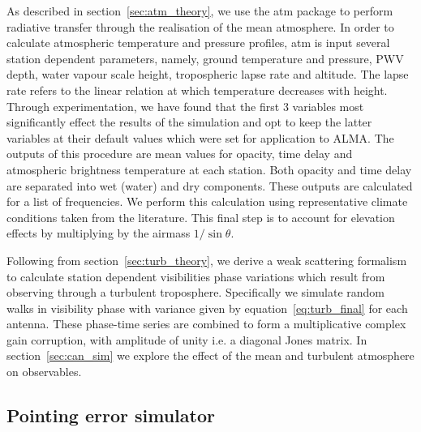 As described in section~\ref{sec:atm_theory}, we use the {\sc atm} package to perform radiative transfer through the realisation of the mean atmosphere. 
In order to calculate atmospheric temperature and pressure profiles, {\sc atm} is input several station dependent parameters, namely, ground temperature and pressure, PWV depth, water vapour scale height, tropospheric lapse rate  and altitude. The lapse rate refers to the linear relation at which temperature decreases with height. Through experimentation, we have found that the first 3 variables most significantly effect the results of the simulation and opt to keep the latter variables at their default values which were set for application to ALMA. 
The outputs of this procedure are mean values for opacity, time delay and atmospheric brightness temperature at each station. Both opacity and time delay are separated into wet (water) and dry components. These outputs are calculated for a list of frequencies.
We perform this calculation using representative climate conditions taken from the literature. This final step is to account for elevation effects by multiplying by the airmass $1/\sin\theta$. 

Following from section~\ref{sec:turb_theory}, we derive a weak scattering formalism to calculate station dependent visibilities phase variations which result from observing through a turbulent troposphere. Specifically we simulate random walks in visibility phase with variance given by equation~\ref{eq:turb_final} for each antenna. These phase-time series are combined to form a multiplicative complex gain corruption, with amplitude of unity i.e. a diagonal Jones matrix. In section~\ref{sec:can_sim} we explore the effect of the mean and turbulent atmosphere on observables.

\subsection{Pointing error simulator}\label{sec:point_imp}

